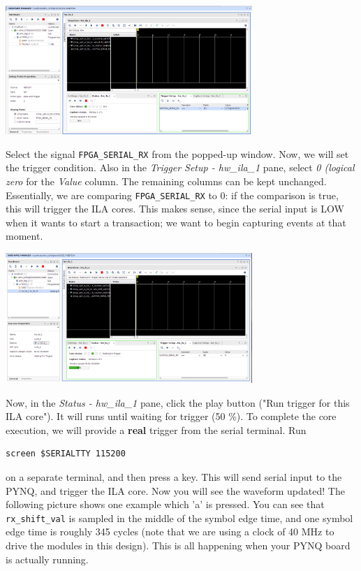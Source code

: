 \documentclass[11pt]{article}
\begin{document}
\begin{center}
\includegraphics[width=0.7\textwidth]{figs/vivado-ila-7.png}
\end{center}

Select the signal \verb|FPGA_SERIAL_RX| from the popped-up window. Now, we will set the trigger condition. Also in the \emph{Trigger Setup - hw\_ila\_1} pane, select \emph{0 (logical zero} for the \emph{Value} column. The remaining columns can be kept unchanged. Essentially, we are comparing \verb|FPGA_SERIAL_RX| to 0: if the comparison is true, this will trigger the ILA cores. This makes sense, since the serial input is LOW when it wants to start a transaction; we want to begin capturing events at that moment.

\begin{center}
\includegraphics[width=0.7\textwidth]{figs/vivado-ila-8.png}
\end{center}

Now, in the \emph{Status - hw\_ila\_1} pane, click the play button ("Run trigger for this ILA core"). It will runs until waiting for trigger (50 \%). To complete the core execution, we will provide a \textbf{real} trigger from the serial terminal. Run

\begin{verbatim}
screen $SERIALTTY 115200
\end{verbatim}

on a separate terminal, and then press a key. This will send serial input to the PYNQ, and trigger the ILA core. Now you will see the waveform updated! The following picture shows one example which 'a' is pressed. You can see that \verb|rx_shift_val| is sampled in the middle of the symbol edge time, and one symbol edge time is roughly 345 cycles (note that we are using a clock of 40 MHz to drive the modules in this design). This is all happening when your PYNQ board is actually running.
\end{document}
